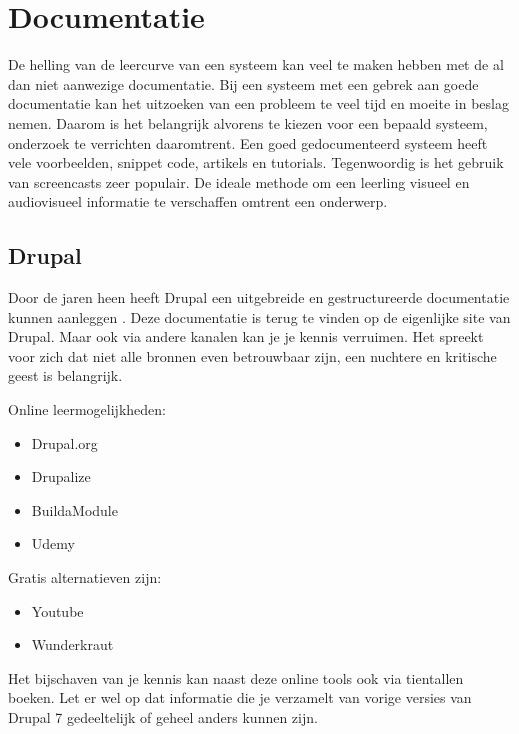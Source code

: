 \section{Documentatie}
De helling van de leercurve van een systeem kan veel te maken hebben met de al dan niet aanwezige documentatie. Bij een systeem met een gebrek aan goede documentatie kan het uitzoeken van een probleem te veel tijd en moeite in beslag nemen. Daarom is het belangrijk alvorens te kiezen voor een bepaald systeem, onderzoek te verrichten daaromtrent. Een goed gedocumenteerd systeem heeft vele voorbeelden, snippet code, artikels en tutorials. Tegenwoordig is het gebruik van screencasts zeer populair. De ideale methode om een leerling visueel en audiovisueel informatie te verschaffen omtrent een onderwerp.

\subsection{Drupal}
Door de jaren heen heeft Drupal een uitgebreide en gestructureerde documentatie kunnen aanleggen \citep{Drupal2016CommunityDocumentation}. Deze documentatie is terug te vinden op de eigenlijke site van Drupal. Maar ook via andere kanalen kan je je kennis verruimen. Het spreekt voor zich dat niet alle bronnen even betrouwbaar zijn, een nuchtere en kritische geest is belangrijk.
\newline\newline

Online leermogelijkheden:
\begin{itemize}
	\item{Drupal.org} \citep{Drupal2016CommunityDocumentation}
	\item{Drupalize} \citep{Drupalize-meDrupalTutorials}
	\item{BuildaModule} \citep{BuildAModule2016BuildAModuleCollections}
	\item{Udemy} \citep{Udemy2016UdemyCourses}
\end{itemize}

\noindent
Gratis alternatieven zijn:
\begin{itemize}
  \item{Youtube}
  \item{Wunderkraut} \citep{FalkJohan2015LearningDrupal}
\end{itemize}

\noindent
Het bijschaven van je kennis kan naast deze online tools ook via tientallen boeken. Let er wel op dat informatie die je verzamelt van vorige versies van Drupal 7 gedeeltelijk of geheel anders kunnen zijn.
\newline\newline

